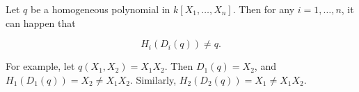 Let $q$ be a homogeneous polynomial in $k[X_1, \ldots, X_n]$. Then for any $i = 1, \ldots, n$, it can happen that

$$H_i(D_i(q)) \neq q.$$

For example, let $q(X_1, X_2) = X_1 X_2$. Then $D_1(q) = X_2$, and $H_1(D_1(q)) = X_2 \neq X_1 X_2$. Similarly, $H_2(D_2(q)) = X_1 \neq X_1 X_2$.
